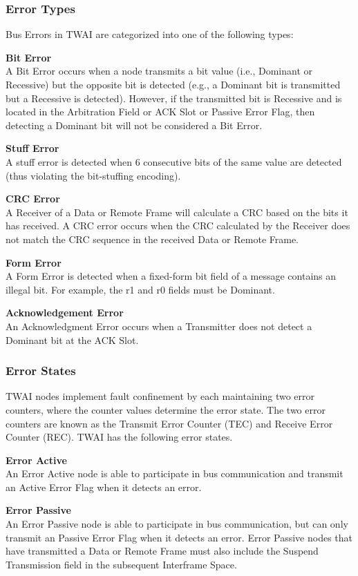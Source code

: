 \documentclass[main\_\_EN.tex]{subfiles}
\begin{document}
\subsubsection{Error Types}

Bus Errors in TWAI are categorized into one of the following types:

{\bfseries Bit Error}\\
A Bit Error occurs when a node transmits a bit value (i.e., Dominant or Recessive) but the opposite bit is detected (e.g., a Dominant bit is transmitted but a Recessive is detected). However, if the transmitted bit is Recessive and is located in the Arbitration Field or ACK Slot or Passive Error Flag, then detecting a Dominant bit will not be considered a Bit Error.


{\bfseries Stuff Error}\\
A stuff error is detected when 6 consecutive bits of the same value are detected (thus violating the bit-stuffing encoding).

{\bfseries CRC Error}\\
A Receiver of a Data or Remote Frame will calculate a CRC based on the bits it has received. A CRC error occurs when the CRC calculated by the Receiver does not match the CRC sequence in the received Data or Remote Frame.

{\bfseries Form Error}\\
A Form Error is detected when a fixed-form bit field of a message contains an illegal bit. For example, the r1 and r0 fields must be Dominant.

{\bfseries Acknowledgement Error}\\
An Acknowledgment Error occurs when a Transmitter does not detect a Dominant bit at the ACK Slot.

\subsubsection{Error States}
TWAI nodes implement fault confinement by each maintaining two error counters, where the counter values determine the error state. The two error counters are known as the Transmit Error Counter (TEC) and Receive Error Counter (REC). TWAI has the following error states.

{\bfseries Error Active}\\
An Error Active node is able to participate in bus communication and transmit an Active Error Flag when it detects an error.

{\bfseries Error Passive}\\
An Error Passive node is able to participate in bus communication, but can only transmit an Passive Error Flag when it detects an error. Error Passive nodes that have transmitted a Data or Remote Frame must also include the Suspend Transmission field in the subsequent Interframe Space.
\end{document}

